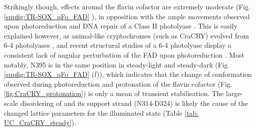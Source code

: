 Strikingly though, effects around the flavin cofactor are extremely moderate (Fig. \ref{supfig:TR-SOX_qFo_FAD} ), in opposition with the ample movements observed upon photoreduction and DNA repair of a Class II photolyase \parencite{maestre-reynaSerialCrystallographyCaptures2022, maestre-reynaVisualizingDNARepair2023a}. This is easily explained however, as animal-like cryptochromes (such as CraCRY) evolved from 6-4 photolyases \parencite{meiEvolutionaryHistoryPhotolyase2015}, and recent structural studies of a 6-4 photolyase display a consistent lack of angular perturbation of the FAD upon photoreduction \parencite{celliniStructuralBasisRadical2022, celliniDirectedUltrafastConformational2024}. Most notably, N395 is in the same position in steady-light and steady-dark (Fig. \ref{supfig:TR-SOX_qFo_FAD} (f)), which indicates that the change of conformation observed during photoreduction and protonation of the flavin cofactor (Fig. \ref{fig:CraCRY_protonation}) is only a mean of transient stabilisation. 
The large-scale disordering of  and its support strand (N314-D324) is likely the cause of the changed lattice parameters for the illuminated state (Table \ref{tab: UC_CraCRY_steady}). 
